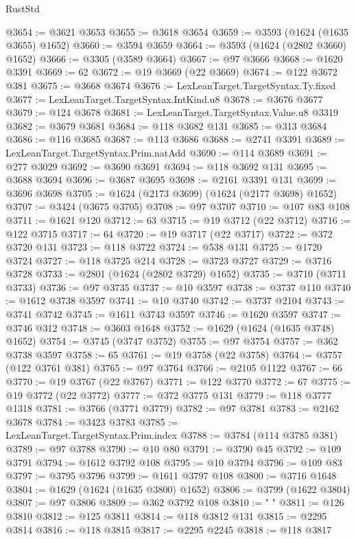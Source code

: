\begin{lexlean}{RustStd}
\begin{coremodule}
@3654 := @3621 @3653
@3655 := @3618 @3654
@3659 := @3593 (@1624 (@1635 @3655) @1652)
@3660 := @3594 @3659
@3664 := @3593 (@1624 (@2802 @3660) @1652)
@3666 := @3305 (@3589 @3664)
@3667 := @97 @3666
@3668 := @1620 @3391
@3669 := 62
@3672 := @19 @3669 (@22 @3669)
@3674 := @122 @3672 @381
@3675 := @3668 @3674
@3676 := LexLeanTarget.TargetSyntax.Ty.fixed
@3677 := LexLeanTarget.TargetSyntax.IntKind.u8
@3678 := @3676 @3677
@3679 := @124 @3678
@3681 := LexLeanTarget.TargetSyntax.Value.u8 @3319
@3682 := @3679 @3681
@3684 := @118 @3682 @131
@3685 := @313 @3684
@3686 := @116 @3685
@3687 := @113 @3686
@3688 := @2741 @3391
@3689 := LexLeanTarget.TargetSyntax.Prim.natAdd
@3690 := @114 @3689
@3691 := @277 @3029
@3692 := @3690 @3691
@3694 := @118 @3692 @131
@3695 := @3688 @3694
@3696 := @3687 @3695
@3698 := @2161 @3391 @131
@3699 := @3696 @3698
@3705 := @1624 (@2173 @3699) (@1624 (@2177 @3698) @1652)
@3707 := @3424 (@3675 @3705)
@3708 := @97 @3707
@3710 := @107 @83 @108
@3711 := @1621 @120
@3712 := 63
@3715 := @19 @3712 (@22 @3712)
@3716 := @122 @3715
@3717 := 64
@3720 := @19 @3717 (@22 @3717)
@3722 := @372 @3720 @131
@3723 := @118 @3722
@3724 := @538 @131
@3725 := @1720 @3724
@3727 := @118 @3725 @214
@3728 := @3723 @3727
@3729 := @3716 @3728
@3733 := @2801 (@1624 (@2802 @3729) @1652)
@3735 := @3710 (@3711 @3733)
@3736 := @97 @3735
@3737 := @10 @3597
@3738 := @3737 @110
@3740 := @1612 @3738 @3597
@3741 := @10 @3740
@3742 := @3737 @2104
@3743 := @3741 @3742
@3745 := @1611 @3743 @3597
@3746 := @1620 @3597
@3747 := @3746 @312
@3748 := @3603 @1648
@3752 := @1629 (@1624 (@1635 @3748) @1652)
@3754 := @3745 (@3747 @3752)
@3755 := @97 @3754
@3757 := @362 @3738 @3597
@3758 := 65
@3761 := @19 @3758 (@22 @3758)
@3764 := @3757 (@122 @3761 @381)
@3765 := @97 @3764
@3766 := @2105 @1122
@3767 := 66
@3770 := @19 @3767 (@22 @3767)
@3771 := @122 @3770
@3772 := 67
@3775 := @19 @3772 (@22 @3772)
@3777 := @372 @3775 @131
@3779 := @118 @3777 @1318
@3781 := @3766 (@3771 @3779)
@3782 := @97 @3781
@3783 := @2162 @3678
@3784 := @3423 @3783
@3785 := LexLeanTarget.TargetSyntax.Prim.index
@3788 := @3784 (@114 @3785 @381)
@3789 := @97 @3788
@3790 := @10 @80
@3791 := @3790 @45
@3792 := @109 @3791
@3794 := @1612 @3792 @108
@3795 := @10 @3794
@3796 := @109 @83
@3797 := @3795 @3796
@3799 := @1611 @3797 @108
@3800 := @3716 @1648
@3804 := @1629 (@1624 (@1635 @3800) @1652)
@3806 := @3799 (@1622 @3804)
@3807 := @97 @3806
@3809 := @362 @3792 @108
@3810 := "          "
@3811 := @126 @3810
@3812 := @125 @3811
@3814 := @118 @3812 @131
@3815 := @2295 @3814
@3816 := @118 @3815
@3817 := @2295 @2245
@3818 := @118 @3817

\end{coremodule}
\end{lexlean}
